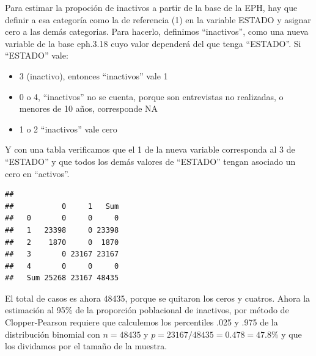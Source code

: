 \documentclass[]{book}
\newenvironment{Shaded}{\begin{snugshade}}{\end{snugshade}}
\newcommand{\DecValTok}[1]{\textcolor[rgb]{0.00,0.00,0.81}{#1}}
\newcommand{\FloatTok}[1]{\textcolor[rgb]{0.00,0.00,0.81}{#1}}
\newcommand{\KeywordTok}[1]{\textcolor[rgb]{0.13,0.29,0.53}{\textbf{#1}}}
\newcommand{\NormalTok}[1]{#1}
\newcommand{\OperatorTok}[1]{\textcolor[rgb]{0.81,0.36,0.00}{\textbf{#1}}}
\newcommand{\OtherTok}[1]{\textcolor[rgb]{0.56,0.35,0.01}{#1}}
\newcommand{\StringTok}[1]{\textcolor[rgb]{0.31,0.60,0.02}{#1}}
\providecommand{\tightlist}{%
  \setlength{\itemsep}{0pt}\setlength{\parskip}{0pt}}
\begin{document}
Para estimar la propoción de inactivos a partir de la base de la EPH, hay que definir a esa categoría como la de referencia (1) en la variable ESTADO y asignar cero a las demás categorias. Para hacerlo, definimos ``inactivos'', como una nueva variable de la base eph.3.18 cuyo valor dependerá del que tenga ``ESTADO''. Si ``ESTADO'' vale:

\begin{itemize}
\tightlist
\item
  3 (inactivo), entonces ``inactivos'' vale 1
\item
  0 o 4, ``inactivos'' no se cuenta, porque son entrevistas no realizadas, o menores de 10 años, corresponde NA
\item
  1 o 2 ``inactivos'' vale cero
\end{itemize}

Y con una tabla verificamos que el 1 de la nueva variable corresponda al 3 de ``ESTADO'' y que todos los demás valores de ``ESTADO'' tengan asociado un cero en ``activos''.

\begin{Shaded}
\end{Shaded}

\begin{verbatim}
##      
##           0     1   Sum
##   0       0     0     0
##   1   23398     0 23398
##   2    1870     0  1870
##   3       0 23167 23167
##   4       0     0     0
##   Sum 25268 23167 48435
\end{verbatim}

El total de casos es ahora 48435, porque se quitaron los ceros y cuatros. Ahora la estimación al 95\% de la proporción poblacional de inactivos, por método de Clopper-Pearson requiere que calculemos los percentiles .025 y .975 de la distribución binomial con \(n=48435\) y \(p=23167/48435=0.478=47.8\%\) y que los dividamos por el tamaño de la muestra.
\end{document}
